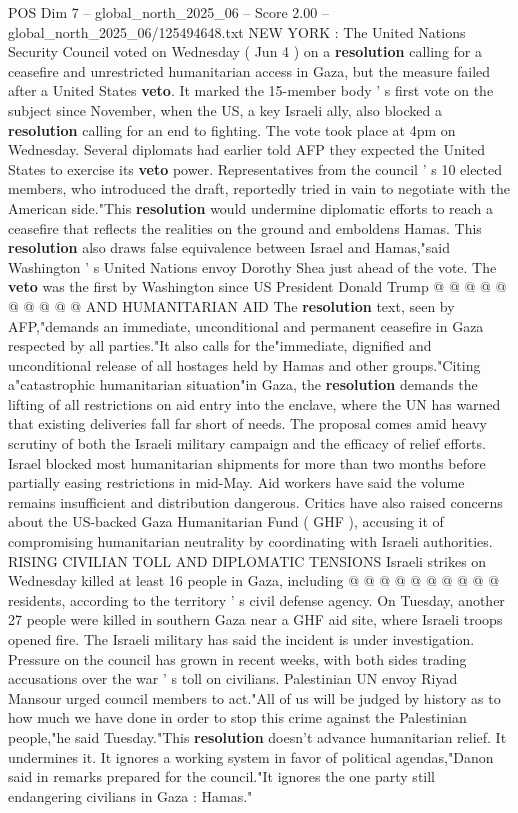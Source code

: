 \begin{textsample}{POS Dim 7 – global\_north\_2025\_06 – Score 2.00 – global\_north\_2025\_06/125494648.txt}  \label{ex:f7_pos_374}
NEW YORK : The United Nations Security Council voted on Wednesday ( Jun 4 ) on a \textbf{resolution} calling for a ceasefire and unrestricted humanitarian access in Gaza, but the measure failed after a United States \textbf{veto}.
It marked the 15-member body ' s first vote on the subject since November, when the US, a key Israeli ally, also blocked a \textbf{resolution} calling for an end to fighting.
The vote took place at 4pm on Wednesday.
Several diplomats had earlier told AFP they expected the United States to exercise its \textbf{veto} power.
Representatives from the council ' s 10 elected members, who introduced the draft, reportedly tried in vain to negotiate with the American side."This \textbf{resolution} would undermine diplomatic efforts to reach a ceasefire that reflects the realities on the ground and emboldens Hamas.
This \textbf{resolution} also draws false equivalence between Israel and Hamas,"said Washington ' s United Nations envoy Dorothy Shea just ahead of the vote.
The \textbf{veto} was the first by Washington since US President Donald Trump @ @ @ @ @ @ @ @ @ @ AND HUMANITARIAN AID The \textbf{resolution} text, seen by AFP,"demands an immediate, unconditional and permanent ceasefire in Gaza respected by all parties."It also calls for the"immediate, dignified and unconditional release of all hostages held by Hamas and other groups."Citing a"catastrophic humanitarian situation"in Gaza, the \textbf{resolution} demands the lifting of all restrictions on aid entry into the enclave, where the UN has warned that existing deliveries fall far short of needs.
The proposal comes amid heavy scrutiny of both the Israeli military campaign and the efficacy of relief efforts.
Israel blocked most humanitarian shipments for more than two months before partially easing restrictions in mid-May.
Aid workers have said the volume remains insufficient and distribution dangerous.
Critics have also raised concerns about the US-backed Gaza Humanitarian Fund ( GHF ), accusing it of compromising humanitarian neutrality by coordinating with Israeli authorities.
RISING CIVILIAN TOLL AND DIPLOMATIC TENSIONS Israeli strikes on Wednesday killed at least 16 people in Gaza, including @ @ @ @ @ @ @ @ @ @ residents, according to the territory ' s civil defense agency.
On Tuesday, another 27 people were killed in southern Gaza near a GHF aid site, where Israeli troops opened fire.
The Israeli military has said the incident is under investigation.
Pressure on the council has grown in recent weeks, with both sides trading accusations over the war ' s toll on civilians.
Palestinian UN envoy Riyad Mansour urged council members to act."All of us will be judged by history as to how much we have done in order to stop this crime against the Palestinian people,"he said Tuesday."This \textbf{resolution} doesn't advance humanitarian relief.
It undermines it.
It ignores a working system in favor of political agendas,"Danon said in remarks prepared for the council."It ignores the one party still endangering civilians in Gaza : Hamas."

\end{textsample}

